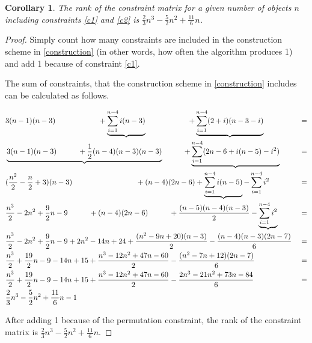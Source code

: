 \documentclass{scrartcl}
\newtheorem{corollary}{Corollary}
\theoremstyle{plain}
\begin{document}
\begin{mdframed}
\begin{corollary}\label{rank}
	The rank of the constraint matrix for a given number of objects $n$ including constraints \ref{c1} and \ref{c2} is $\frac{2}{3}n^3-\frac{5}{2}n^2+\frac{11}{6}n$.
\end{corollary}
\vspace{7pt}
\end{mdframed}

\begin{proof}
	Simply count how many constraints are included in the construction scheme in \ref{construction} (in other words, how often the algorithm produces 1) and add 1 because of constraint \ref{c1}.
	
	The sum of constraints, that the construction scheme in \ref{construction} includes can be calculated as follows.
	
	\begin{align*}
		&3(n-1)(n-3) \hspace{2 cm} +\underbrace{\sum_{i=1}^{n-4}i(n-3)} \hspace{2 cm} +\underbrace{\sum_{i=1}^{n-4}(2+i)(n-3-i)} &&= \\
		&\underbrace{3(n-1)(n-3) \hspace{1 cm}+ \frac{1}{2}(n-4)(n-3)(n-3)} \hspace{1 cm}+\underbrace{\sum_{i=1}^{n-4}(2n-6+i(n-5)-i^2)} &&= \\
		&(\frac{n^2}{2}-\frac{n}{2}+3)(n-3) \hspace{3 cm}+ (n-4)(2n-6) +\underbrace{\sum_{i=1}^{n-4}i(n-5)}-\sum_{i=1}^{n-4}i^2  &&= \\
		&\frac{n^3}{2} -2n^2+\frac{9}{2}n -9 \hspace{1 cm}+ (n-4)(2n-6) \hspace{1cm}+\frac{(n-5)(n-4)(n-3)}{2}-\underbrace{\sum_{i=1}^{n-4}i^2}  &&= \\
		&\frac{n^3}{2} -2n^2+\frac{9}{2}n -9 + 2n^2-14n+24 +\frac{(n^2-9n+20)(n-3)}{2}-\frac{(n-4)(n-3)(2n-7)}{6}  &&= \\
		&\frac{n^3}{2}+\frac{19}{2}n-9-14n+15 +\frac{n^3-12n^2+47n-60}{2}-\frac{(n^2-7n+12)(2n-7)}{6}  &&= \\
		&\frac{n^3}{2}+\frac{19}{2}n-9-14n+15 +\frac{n^3-12n^2+47n-60}{2}-\frac{2n^3-21n^2+73n-84}{6}  &&= \\
		&\frac{2}{3}n^3-\frac{5}{2}n^2+\frac{11}{6}n-1 &&
	\end{align*}
	
	After adding 1 because of the permutation constraint, the rank of the constraint matrix is $\frac{2}{3}n^3-\frac{5}{2}n^2+\frac{11}{6}n$.
\end{proof}
\end{document}
